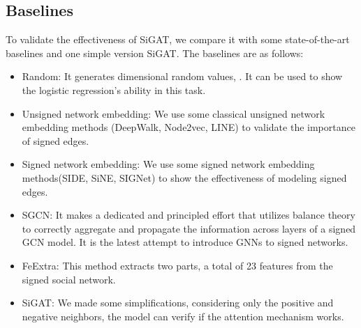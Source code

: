 \documentclass[runningheads]{llncs}
\begin{document}
\subsection{Baselines}

To validate the effectiveness of SiGAT, we compare it with some state-of-the-art baselines and one simple version SiGAT. The baselines are as follows:

\begin{itemize}
    \item Random: It generates  dimensional random values, . It can be used to show the logistic regression's ability in this task.
    
    \item Unsigned network embedding: We use some classical unsigned network embedding methods (\eg DeepWalk\cite{perozzi2014deepwalk},  Node2vec\cite{grover2016node2vec}, LINE\cite{tang2015line}) to validate the importance of signed edges.
    
    \item Signed network embedding: We use some signed network embedding methods(\eg SIDE\cite{kim2018side}, SiNE\cite{wang2017signed}, SIGNet\cite{islam2018signet}) to show the effectiveness of modeling signed edges.

    \item SGCN\cite{derr2018signed}: It makes a dedicated and principled effort that utilizes balance theory to correctly aggregate and propagate the information across layers of a signed GCN model. It is the latest attempt to introduce GNNs to signed networks.

    \item FeExtra\cite{leskovec2010predicting}: This method extracts two parts, a total of 23 features from the signed social network. 


    \item SiGAT: We made some simplifications, considering only the positive and negative neighbors, the model can verify if the attention mechanism works.
\end{itemize}
\end{document}
